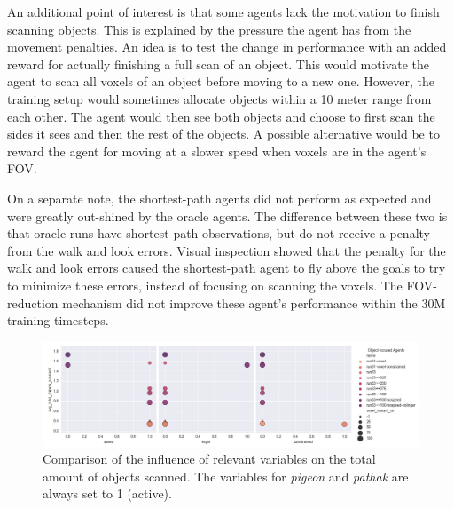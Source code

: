       
        An additional point of interest is that some agents lack the motivation to finish scanning objects. This is explained by the pressure the agent has from the movement penalties. 
        An idea is to test the change in performance with an added reward for actually finishing a full scan of an object. 
        This would motivate the agent to scan all voxels of an object before moving to a new one. 
        However, the training setup would sometimes allocate objects within a 10 meter range from each other. 
        The agent would then see both objects and choose to first scan the sides it sees and then the rest of the objects. 
        A possible alternative would be to reward the agent for moving at a slower speed when voxels are in the agent's FOV.
       
       
    
        On a separate note, the shortest-path agents did not perform as expected and were greatly out-shined by the oracle agents. 
        The difference between these two is that oracle runs have shortest-path observations, but do not receive a penalty from the walk and look errors. 
        Visual inspection showed that the penalty for the walk and look errors caused the shortest-path agent to fly above the goals to try to minimize these errors, instead of focusing on scanning the voxels. 
        The FOV-reduction mechanism did not improve these agent's performance within the 30M training timesteps. 
        
        
        \begin{figure}[!ht]
        \centering
        \includegraphics[width=1\textwidth]{images/results_variables_obj.png} 
        \caption{Comparison of the influence of relevant variables on the total amount of objects scanned. The variables for \textit{pigeon} and \textit{pathak} are always set to 1 (active).}
        \label{fig:results_variables_obj}
        \end{figure}
        
